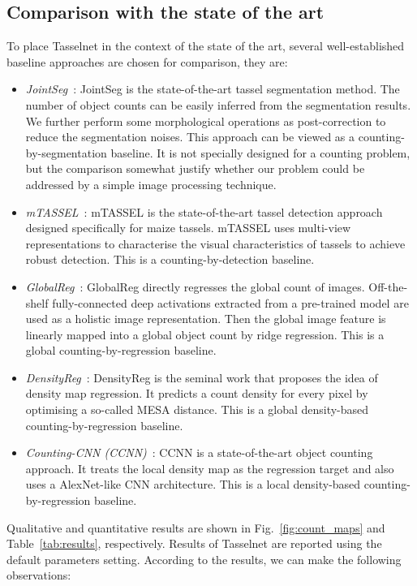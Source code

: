 \documentclass[twocolumn]{bmcart}%
\begin{document}
\subsection*{Comparison with the state of the art}
%
To place Tasselnet in the context of the state of the art, several well-established baseline approaches are chosen for comparison, they are:
\begin{itemize}
	\item \textit{JointSeg}~\cite{lu2016region}: JointSeg is the state-of-the-art tassel segmentation method. The number of object counts can be easily inferred from the segmentation results. We further perform some morphological operations as post-correction to reduce the segmentation noises. This approach can be viewed as a counting-by-segmentation baseline. It is not specially designed for a counting problem, but the comparison somewhat justify whether our problem could be addressed by a simple image processing technique.
	\item \textit{mTASSEL}~\cite{lu2015fine}: mTASSEL is the state-of-the-art tassel detection approach designed specifically for maize tassels. mTASSEL uses multi-view representations to characterise the visual characteristics of tassels to achieve robust detection. This is a counting-by-detection baseline.
	\item \textit{GlobalReg}~\cite{tota2015counting}: GlobalReg directly regresses the global count of images. Off-the-shelf fully-connected deep activations extracted from a pre-trained model are used as a holistic image representation. Then the global image feature is linearly mapped into a global object count by ridge regression. This is a global counting-by-regression baseline.
	\item \textit{DensityReg}~\cite{vlaz2010denlearn}: DensityReg is the seminal work that proposes the idea of density map regression. It predicts a count density for every pixel by optimising a so-called MESA distance. This is a global density-based counting-by-regression baseline.
	\item \textit{Counting-CNN (CCNN)}~\cite{onoro2016towards}: CCNN is a state-of-the-art object counting approach. It treats the local density map as the regression target and also uses a AlexNet-like CNN architecture. This is a local density-based counting-by-regression baseline.
\end{itemize}
Qualitative and quantitative results are shown in Fig.~\ref{fig:count_maps} and Table~\ref{tab:results}, respectively. Results of Tasselnet are reported using the default parameters setting. According to the results, we can make the following observations:
\end{document}
